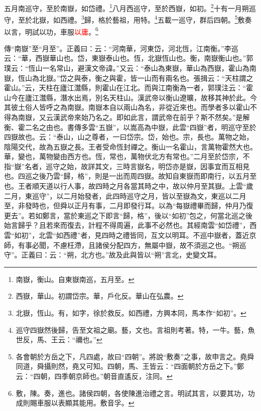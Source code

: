 五月南巡守，至於南嶽，如岱禮。\footnote{南嶽，衡山。自東嶽南巡，五月至。}八月西巡守，至於西嶽，如初。\footnote{西嶽，華山。初謂岱宗。華，戶化反。華山在弘農。}十有一月朔巡守，至於北嶽，如西禮。\footnote{北嶽，恆山。有，如字，徐於救反。如西禮，方興本同，馬本作“如初”。}歸，格於藝祖，用特。\footnote{巡守四嶽然後歸，告至文祖之廟。藝，文也。言祖則考著。特，一牛。藝，魚世反，馬、王云：“禰也。”}五載一巡守，群后四朝。\footnote{各會朝於方岳之下，凡四處，故曰“四朝”。將說“敷奏”之事，故申言之。堯舜同道，舜攝則然，堯又可知。四朝，馬、王皆云：“四面朝於方岳之下。”鄭云：“四朝，四季朝京師也。”朝音直遙反，注同。}敷奏以言，明試以功，車服\textcolor{red}{以庸}。\footnote{敷，陳。奏，進也。諸侯四朝，各使陳進治禮之言。明試其言，以要其功，功成則賜車服以表顯其能用。敷音孚。}

{\noindent\zhuan{}\fzbyks 傳“南嶽”至“月至”。正義曰：云：“河南華，河東岱，河北恆，江南衡。”李巡云：“華，西嶽華山也。岱，東嶽泰山也。恆，北嶽恆山也。衡，南嶽衡山也。”郭璞云：“恆山一名常山，避漢文帝諱。”又云：“泰山為東嶽，華山為西嶽，霍山為南嶽，恆山為北嶽。”岱之與泰，衡之與霍，皆一山而有兩名也。張揖云：“天柱謂之霍山。”云，天柱在廬江灊縣，則霍山在江北。而與江南衡為一者，郭璞注云：“霍山今在廬江灊縣，潛水出焉，別名天柱山。漢武帝以衡山遼曠，故移其神於此。今其彼土俗人皆呼之為南嶽。南嶽本自以兩山為名，非從近來也。而學者多以霍山不得為南嶽，又云漢武帝來始乃名之。即如此言，謂武帝在前乎？斯不然矣。”是解衡、霍二名之由也。書傳多雲“五嶽”，以嵩高為中嶽，此雲“四嶽”者，明巡守至於四嶽故也。云：“泰山，山之尊者，一曰岱宗。岱，始也。宗，長也。萬物之始，陰陽交代，故為五嶽之長。王者受命恆封禪之。衡山一名霍山，言萬物霍然大也。華，變也，萬物變由西方也。恆，常也，萬物伏北方有常也。”二月至於岱宗，不指“嶽”名者，巡守之始，故詳其文，三時言嶽名，明岱亦是嶽，因事宜而互相見也。四巡之後乃雲“歸，格”，則是一出而周四嶽。故知自東嶽而即南行，以五月至也。王者順天道以行人事，故四時之月各當其時之中，故以仲月至其嶽。上雲“歲二月，東巡守”，以二月始發者，此四時巡守之月，皆以至嶽為文，東巡以二月至，非發時也，但舜以正月有事，二月即發行耳。以為“每嶽禮畢而歸，仲月乃復更去”。若如鄭言，當於東巡之下即言“歸，格”，後以“如初”包之，何當北巡之後始言歸乎？且若來而復去，計程不得周遍，此事不必然也。其經南雲“如岱禮”，西雲“如初”，北雲“如西禮”者，見四時之禮皆同，互文以明耳。不巡中嶽者，蓋近京師，有事必聞，不慮枉滯，且諸侯分配四方，無屬中嶽，故不須巡之也。“朔巡守”。正義曰：云：“朔，北方也。”故及此與皆以“朔”言北，史變文耳。 \par}

